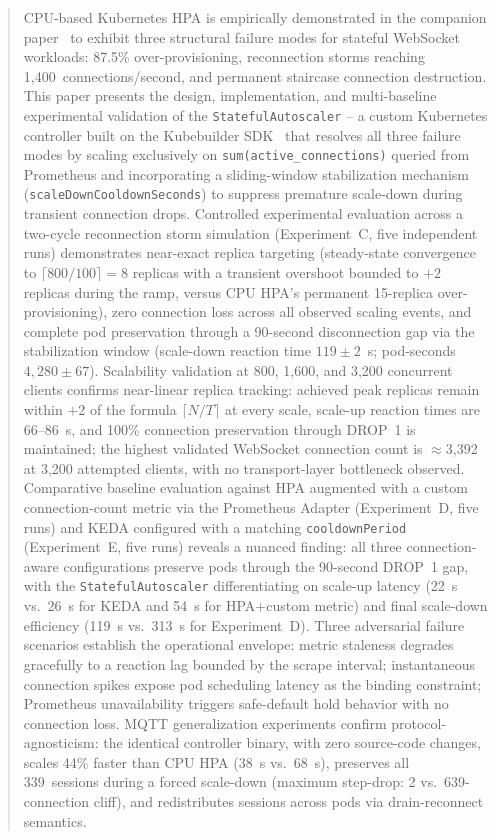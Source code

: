 \documentclass[twocolumn]{svjour3}
\begin{document}
\begin{abstract}
CPU-based Kubernetes HPA is empirically demonstrated in the companion paper~\cite{behera2026hpa}
to exhibit three structural failure modes for stateful WebSocket workloads: 87.5\%
over-provisioning, reconnection storms reaching 1,400~connections/second, and permanent
staircase connection destruction. This paper presents the design, implementation, and
multi-baseline experimental validation of the \texttt{StatefulAutoscaler} -- a custom Kubernetes
controller built on the Kubebuilder SDK~\cite{kubebuilder_docs} that resolves all three failure
modes by scaling exclusively on \texttt{sum(active\_connections)} queried from Prometheus and
incorporating a sliding-window stabilization mechanism (\texttt{scaleDownCooldownSeconds}) to
suppress premature scale-down during transient connection drops. Controlled experimental
evaluation across a two-cycle reconnection storm simulation (Experiment~C, five independent
runs) demonstrates near-exact replica targeting (steady-state convergence to
$\lceil800/100\rceil = 8$ replicas with a transient overshoot bounded to $+2$ replicas during
the ramp, versus CPU HPA's permanent 15-replica over-provisioning), zero
connection loss across all observed scaling events, and complete pod preservation through a
90-second disconnection gap via the stabilization window (scale-down reaction time
$119 \pm 2$~s; pod-seconds $4{,}280 \pm 67$). Scalability validation at 800, 1{,}600, and
3{,}200 concurrent clients confirms near-linear replica tracking: achieved peak replicas
remain within $+2$ of the formula $\lceil N/T \rceil$ at every scale, scale-up reaction
times are 66--86~s, and 100\% connection preservation through DROP~1 is maintained; the
highest validated WebSocket connection count is $\approx$3{,}392 at 3{,}200 attempted
clients, with no transport-layer bottleneck observed. Comparative baseline evaluation against HPA
augmented with a custom connection-count metric via the Prometheus Adapter (Experiment~D,
five runs) and KEDA configured with a matching \texttt{cooldownPeriod} (Experiment~E, five
runs) reveals a nuanced finding: all three connection-aware configurations preserve pods
through the 90-second DROP~1 gap, with the \texttt{StatefulAutoscaler} differentiating on
scale-up latency (22~s vs.\ 26~s for KEDA and 54~s for HPA+custom metric) and final scale-down efficiency (119~s vs.\ 313~s for Experiment~D). Three adversarial failure scenarios establish the operational envelope: metric staleness
degrades gracefully to a reaction lag bounded by the scrape interval; instantaneous connection
spikes expose pod scheduling latency as the binding constraint; Prometheus unavailability
triggers safe-default hold behavior with no connection loss. MQTT generalization experiments
confirm protocol-agnosticism: the identical controller binary, with zero source-code changes,
scales 44\% faster than CPU HPA (38~s vs.\ 68~s), preserves all 339~sessions during a forced
scale-down (maximum step-drop: 2 vs.\ 639-connection cliff), and redistributes sessions across
pods via drain-reconnect semantics.


\end{abstract}
\end{document}
